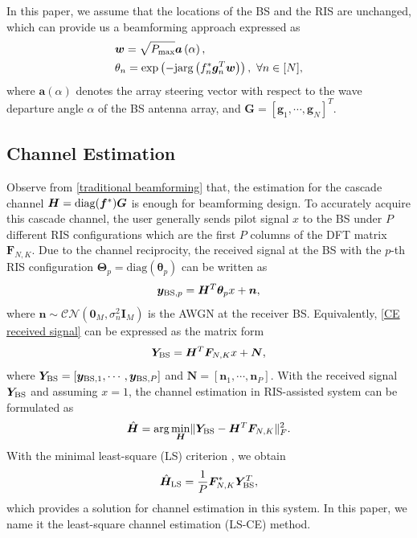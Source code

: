 \documentclass[12pt,draftclsnofoot,journal,onecolumn]{IEEEtran}
\theoremstyle{nonumberplain}
\def \diag {\text{diag}}
\def \exp {\text{exp}}
\def \arg {\text{arg}}
\begin{document}
        
        In this paper, we assume that the locations of the \ac{BS} and the RIS are unchanged, which can provide us a beamforming approach expressed as
                \begin{subequations}
\label{traditional beamforming}
\begin{align}
\label{w_optimal}
&\bm w=\sqrt{P_{\rm max}}\bm a\left(\alpha\right),\\
\label{theta_optimal}
&\theta_{n} = \exp\left(-{\rm j} \arg\left(f_{n}^{*}\bm g_{n}^{T}\bm w\right)\right),~\forall n\in [N],
\end{align}
\end{subequations}
where $\bm a(\alpha)$ denotes the array steering vector with respect to the wave departure angle $\alpha$ of the BS antenna array, and $\bm G = \left[\bm g_{1}, \cdots, \bm g_{N}\right]^{T}$.

\subsection{Channel Estimation}
\label{Channel Estimation}
Observe from \eqref{traditional beamforming} that, the estimation for the cascade channel ${\bm H} = {\rm diag}({\bm f}^{*})\bm G$ is enough for beamforming design.
To accurately acquire this cascade channel, the user generally sends pilot signal $x$ to the BS under $P$ different RIS configurations which are the first $P$ columns of the DFT matrix $\bm F_{N,K}$. Due to the channel reciprocity, the received signal at the BS with the $p$-th RIS configuration $\bm \Theta_{p}=\diag({\bm \theta}_p)$ can be written as \cite{atapattu2020reconfigurable}
    \begin{equation}
    \label{CE received signal}
            {\bm y}_{{\rm BS}, p} =\bm H^{T} {\bm \theta}_p x+\bm n,
    \end{equation}
    where $\bm n\sim \mathcal{CN}\left( \bm 0_{M}, \sigma_{n}^{2}\bm I_{M}\right)$ is the \ac{AWGN} at the receiver BS.
Equivalently, \eqref{CE received signal} can be expressed as the matrix form
    \begin{equation}
    \label{eqn:LS_CE model}
        {\bm Y}_{\rm BS}=\bm H^{T} \bm F_{N,K}x + {\bm N},
    \end{equation}
    where ${\bm Y}_{\rm BS}=\left[\bm y_{{\rm BS}, 1},\cdots,\bm y_{{\rm BS}, P}\right]$ and $\bm N = \left[ \bm n_{1},\cdots,\bm n_{P}\right]$.
With the received signal $\bm Y_{\rm BS}$ and assuming $x=1$, the channel estimation in RIS-assisted system can be formulated as 
    \begin{equation}
        \hat{\bm H} = \arg\min_{\bm H} \lVert {\bm Y}_{\rm BS} - {\bm H^{T}} {\bm F}_{N,K}\rVert_{F}^2.
    \end{equation}
    With the minimal least-square (LS) criterion \cite{kundu2021channel}, we obtain
    \begin{equation}
        \hat{\bm H}_{\rm LS} = \frac{1}{P}{\bm F}_{N,K}^{*}{\bm Y}_{\rm BS}^{T},
        \label{eqn:LS-CE}
    \end{equation}
    which provides a solution for channel estimation in this system. In this paper, we name it the least-square channel estimation (LS-CE) method. 
\end{document}
